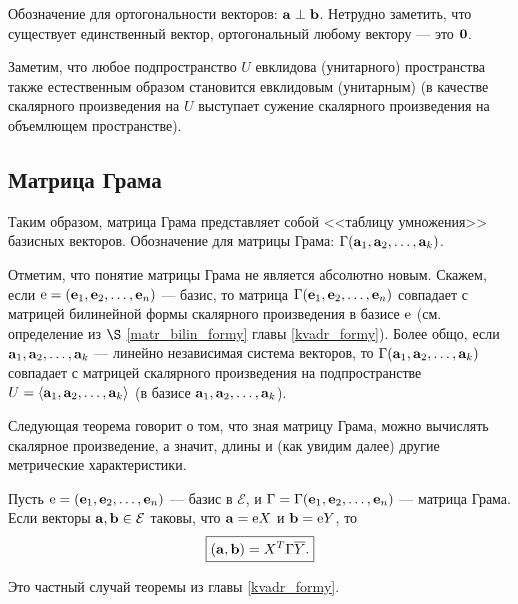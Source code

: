 Обозначение для ортогональности векторов: $\mathbf{a}\perp \mathbf{b}$. Нетрудно заметить, что существует единственный вектор, 
ортогональный любому вектору --- это $\mathbf{0}$.

\otstup

Заметим, что любое подпространство $U$ евклидова (унитарного) пространства
также естественным образом
становится евклидовым (унитарным) (в качестве скалярного произведения на $U$
выступает сужение скалярного произведения на объемлющем пространстве).

\subsection{Матрица Грама}


Таким образом, матрица Грама представляет собой  <<таблицу умножения>> базисных векторов.
Обозначение для матрицы Грама: $\Gamma (\mathbf{a}_1, \mathbf{a}_2, \ldots, \mathbf{a}_k)$.

Отметим, что понятие матрицы Грама не является абсолютно  новым.
Скажем, если $\mathrm{e} = (\mathbf{e}_1, \mathbf{e}_2, \ldots, \mathbf{e}_n)$ --- базис, то
матрица $\Gamma (\mathbf{e}_1, \mathbf{e}_2, \ldots, \mathbf{e}_n)$ совпадает
с матрицей билинейной формы скалярного произведения в базисе $\mathrm{e}$ (см. определение из $\S$ 
\ref{matr_bilin_formy} главы 
\ref{kvadr_formy}).
Более общо, если $\mathbf{a}_1, \mathbf{a}_2, \ldots, \mathbf{a}_k$ --- линейно независимая система
векторов, то $\Gamma (\mathbf{a}_1, \mathbf{a}_2, \ldots, \mathbf{a}_k)$
совпадает с матрицей скалярного произведения на подпространстве
$U = \langle \mathbf{a}_1, \mathbf{a}_2, \ldots, \mathbf{a}_k \rangle$ (в базисе $\mathbf{a}_1, \mathbf{a}_2, \ldots, \mathbf{a}_k$).

Следующая теорема говорит о том, что зная матрицу 
Грама, можно вычислять скалярное произведение, а значит, длины и (как увидим далее) другие метрические характеристики.

\begin{theor}\label{t10_1_1}
Пусть $\mathrm{e} = (\mathbf{e}_1, \mathbf{e}_2, \ldots, \mathbf{e}_n)$ --- базис
в $\mathcal{E}$, и $\Gamma = \Gamma(\mathbf{e}_1, \mathbf{e}_2, \ldots, \mathbf{e}_n)$ --- матрица Грама.
Если векторы $\mathbf{a}, \mathbf{b} \in \mathcal{E}$ таковы, что
$\mathbf{a} = \mathrm{e} X$ и $\mathbf{b} = \mathrm{e} Y$, то $$\boxed{(\mathbf{a}, \mathbf{b}) = X^T\Gamma \overline{Y}.}$$
\end{theor}
\dok Это частный случай теоремы \label{t9_1_1} из главы \ref{kvadr_formy}.
\edok

